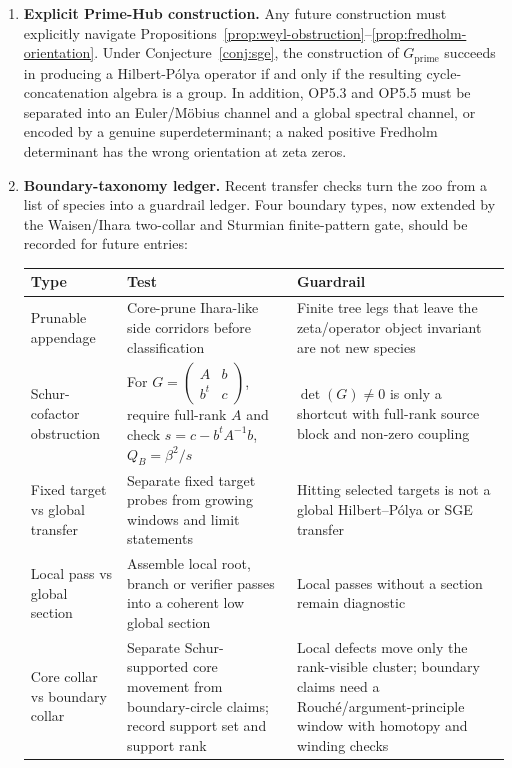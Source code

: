 \documentclass[11pt]{article}
\theoremstyle{definition}
\theoremstyle{remark}
\begin{document}
\begin{enumerate}
\item \textbf{Explicit Prime-Hub construction.} Any future
  construction must explicitly navigate
  Propositions~\ref{prop:weyl-obstruction}--\ref{prop:fredholm-orientation}.
  Under Conjecture~\ref{conj:sge}, the construction of
  $G_\mathrm{prime}$ succeeds in producing a Hilbert-P\'olya
  operator if and only if the resulting cycle-concatenation
  algebra is a group. In addition, OP5.3 and OP5.5 must be separated
  into an Euler/M\"obius channel and a global spectral channel, or
  encoded by a genuine superdeterminant; a naked positive Fredholm
  determinant has the wrong orientation at zeta zeros.

\item \textbf{Boundary-taxonomy ledger.} Recent transfer checks turn
  the zoo from a list of species into a guardrail ledger. Four boundary
  types, now extended by the Waisen/Ihara two-collar and Sturmian
  finite-pattern gate, should be recorded for future entries:
  \begin{center}
  \scriptsize
  \begin{tabular}{@{}p{}p{}p{}@{}}
  \toprule
  Type & Test & Guardrail \\
  \midrule
  Prunable appendage &
  Core-prune Ihara-like side corridors before classification &
  Finite tree legs that leave the zeta/operator object invariant are not new species \\
  Schur-cofactor obstruction &
  For $G=(\begin{smallmatrix}A&b\\ b^t&c\end{smallmatrix})$, require full-rank $A$ and check $s=c-b^tA^{-1}b$, $Q_B=\beta^2/s$ &
  $\det(G)\neq0$ is only a shortcut with full-rank source block and non-zero coupling \\
  Fixed target vs global transfer &
  Separate fixed target probes from growing windows and limit statements &
  Hitting selected targets is not a global Hilbert--P\'olya or SGE transfer \\
  Local pass vs global section &
  Assemble local root, branch or verifier passes into a coherent low global section &
  Local passes without a section remain diagnostic \\
  Core collar vs boundary collar &
  Separate Schur-supported core movement from boundary-circle claims; record support set and support rank &
  Local defects move only the rank-visible cluster; boundary claims need a Rouch\'e/argument-principle window with homotopy and winding checks \\

\end{tabular}
\end{center}
\end{enumerate}
\end{document}

